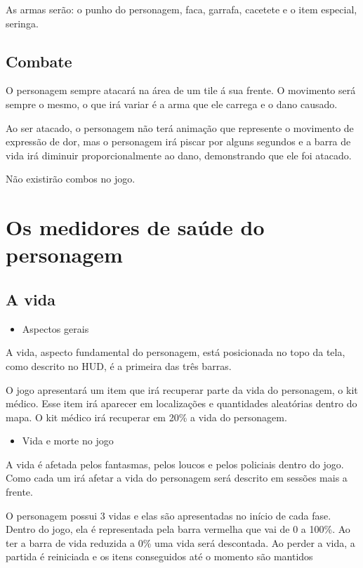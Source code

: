 As armas serão: o punho do personagem, faca, garrafa, cacetete e o item especial, seringa.

\subsection{Combate}
O personagem sempre atacará na área de um tile á sua frente. O movimento será sempre o mesmo, o que irá variar é a arma que ele carrega e o dano causado.

Ao ser atacado, o personagem não terá animação que represente o movimento de expressão de dor, mas o personagem irá piscar por alguns segundos e a barra de vida irá diminuir proporcionalmente ao dano, demonstrando que ele foi atacado.

Não existirão combos no jogo.

\section{\label{edmond} Os medidores de saúde do personagem}
\subsection{A vida}
\begin{itemize}
\item Aspectos gerais
\end{itemize}

A vida, aspecto fundamental do personagem, está posicionada no topo da tela, como descrito no HUD, é a primeira das três barras.

O jogo apresentará um item que irá recuperar parte da vida do personagem, o kit  médico. Esse item irá aparecer em localizações e quantidades aleatórias dentro do mapa. O kit médico irá recuperar em 20\% a vida do personagem.

\begin{itemize}
\item Vida e morte no jogo
\end{itemize}

A vida é afetada pelos fantasmas, pelos loucos e pelos policiais dentro do jogo. Como cada um irá afetar a vida do personagem será descrito em sessões mais a frente.

O personagem possui 3 vidas e elas são apresentadas no início de cada fase. Dentro do jogo, ela é representada pela barra vermelha que vai de 0 a 100\%. Ao ter a barra de vida reduzida a 0\% uma vida será descontada. Ao perder a vida, a partida é reiniciada e os itens conseguidos até o momento são mantidos

